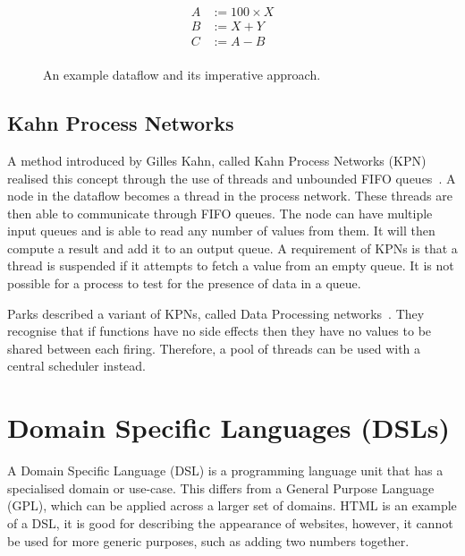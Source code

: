 \documentclass[
author={Riley Evans},
supervisor={Dr. Meng Wang},
degree={MEng},
title={\vbox{Circuit: A Domain Specific Language for Dataflow Programming}},
subtitle={},
type={research},
year={2021}
]{dissertation}
\begin{document}
\begin{figure}[ht]
  \centering
  \begin{subfigure}{0.3\textwidth}
    \centering
    \begin{equation*}
      \begin{aligned}
      A &:= 100 \times X \\
      B &:= X + Y \\
      C &:= A - B \\
      \end{aligned}
    \end{equation*}
    \caption{}
    \label{subfig:dataflow-example-equations}
  \end{subfigure}
  \begin{subfigure}{0.3\textwidth}
    \centering
    
    \caption{}
    \label{subfig:dataflow-example-diagram}
  \end{subfigure}
  \caption{An example dataflow and its imperative approach.}
    \label{fig:dataflow-example}
\end{figure}


\subsection{Kahn Process Networks}
A method introduced by Gilles Kahn, called Kahn Process Networks (KPN) realised this concept through the use of threads
and unbounded FIFO queues~\cite{DBLP:conf/ifip/Kahn74}.
A node in the dataflow becomes a thread in the process network.
These threads are then able to communicate through FIFO queues.
The node can have multiple input queues and is able to read any number of values from them.
It will then compute a result and add it to an output queue.
A requirement of KPNs is that a thread is suspended if it attempts to fetch a value from an empty queue.
It is not possible for a process to test for the presence of data in a queue.

Parks described a variant of KPNs, called Data Processing networks~\cite{381846}.
They recognise that if functions have no side effects then they have no values to be shared between each firing.
Therefore, a pool of threads can be used with a central scheduler instead.




\section{Domain Specific Languages (DSLs)}
A Domain Specific Language (DSL) is a programming language unit that has a specialised domain or use-case.
This differs from a General Purpose Language (GPL), which can be applied across a larger set of domains.
HTML is an example of a DSL, it is good for describing the appearance of websites, however,
it cannot be used for more generic purposes, such as adding two numbers together.
\end{document}

